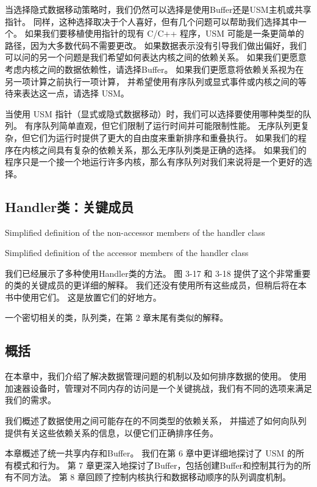当选择隐式数据移动策略时，我们仍然可以选择是使用Buffer还是USM主机或共享指针。 
同样，这种选择取决于个人喜好，但有几个问题可以帮助我们选择其中一个。 
如果我们要移植使用指针的现有 C/C++ 程序，USM 可能是一条更简单的路径，因为大多数代码不需要更改。 
如果数据表示没有引导我们做出偏好，我们可以问的另一个问题是我们希望如何表达内核之间的依赖关系。 
如果我们更愿意考虑内核之间的数据依赖性，请选择Buffer。 
如果我们更愿意将依赖关系视为在另一项计算之前执行一项计算，
并希望使用有序队列或显式事件或内核之间的等待来表达这一点，请选择 USM。

当使用 USM 指针（显式或隐式数据移动）时，我们可以选择要使用哪种类型的队列。 
有序队列简单直观，但它们限制了运行时间并可能限制性能。 
无序队列更复杂，但它们为运行时提供了更大的自由度来重新排序和重叠执行。 
如果我们的程序在内核之间具有复杂的依赖关系，那么无序队列类是正确的选择。 
如果我们的程序只是一个接一个地运行许多内核，那么有序队列对我们来说将是一个更好的选择。

\subsection{Handler类：关键成员}
{\color{red} Simplified definition of the non-accessor members of the handler class}

{\color{red} Simplified definition of the accessor members of the handler class}

我们已经展示了多种使用Handler类的方法。 图 3-17 和 3-18 提供了这个非常重要的类的关键成员的更详细的解释。 
我们还没有使用所有这些成员，但稍后将在本书中使用它们。 这是放置它们的好地方。

一个密切相关的类，队列类，在第 2 章末尾有类似的解释。

\subsection{概括}
在本章中，我们介绍了解决数据管理问题的机制以及如何排序数据的使用。 
使用加速器设备时，管理对不同内存的访问是一个关键挑战，我们有不同的选项来满足我们的需求。

我们概述了数据使用之间可能存在的不同类型的依赖关系，
并描述了如何向队列提供有关这些依赖关系的信息，以便它们正确排序任务。

本章概述了统一共享内存和Buffer。 我们在第 6 章中更详细地探讨了 USM 的所有模式和行为。
第 7 章更深入地探讨了Buffer，包括创建Buffer和控制其行为的所有不同方法。 
第 8 章回顾了控制内核执行和数据移动顺序的队列调度机制。